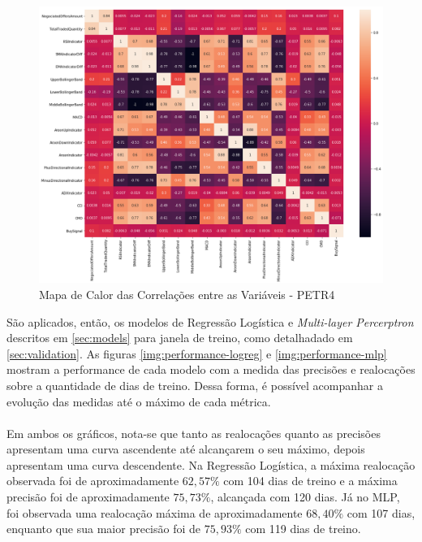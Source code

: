 \documentclass[grad,numbers]{coppe}
\begin{document}
            \begin{figure}[h]
                \caption{Mapa de Calor das Correlações entre as Variáveis - PETR4}
                \label{img:heatmap}
                \includegraphics[width=15cm]{corr.png}
                \centering
            \end{figure}
            
            São aplicados, então, os modelos de Regressão Logística e \textit{Multi-layer Percerptron} descritos em \ref{sec:models} para janela de treino, como detalhadado em \ref{sec:validation}. As figuras \ref{img:performance-logreg} e \ref{img:performance-mlp} mostram a performance de cada modelo com a medida das precisões e realocações sobre a quantidade de dias de treino. Dessa forma, é possível acompanhar a evolução das medidas até o máximo de cada métrica.
            
            \paragraph{}Em ambos os gráficos, nota-se que tanto as realocações quanto as precisões apresentam uma curva ascendente até alcançarem o seu máximo, depois apresentam uma curva descendente. Na Regressão Logística, a máxima realocação observada foi de aproximadamente $62,57\%$ com 104 dias de treino e a máxima precisão foi de aproximadamente $75,73\%$, alcançada com 120 dias. Já no MLP, foi observada uma realocação máxima de aproximadamente $68,40\%$ com 107 dias, enquanto que sua maior precisão foi de $75,93\%$ com 119 dias de treino.
            
\end{document}
